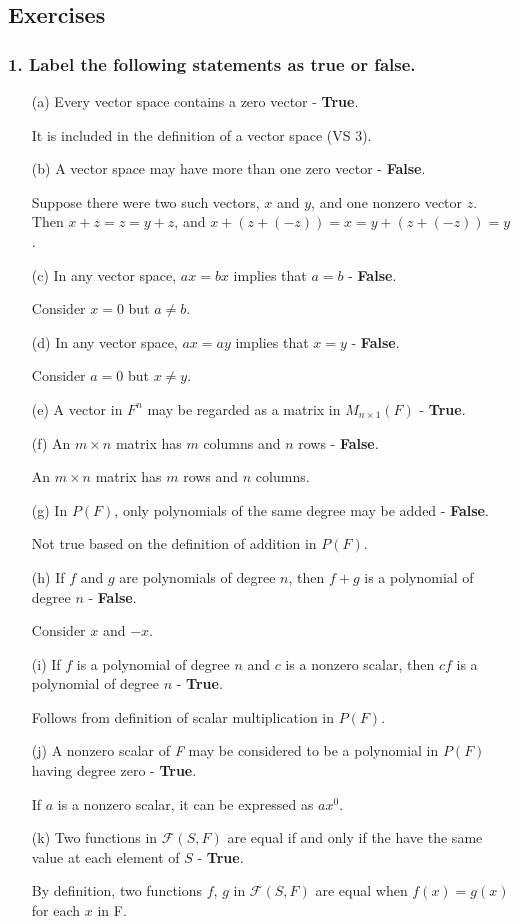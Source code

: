 \documentclass{article}
\begin{document}
\pagebreak
\subsection*{Exercises}
\subsubsection*{1. Label the following statements as true or false.}
\begin{enumerate}
	\item[(a)] Every vector space contains a zero vector - \textbf{True}.
	
	It is included in the definition of a vector space (VS 3).
	\item[(b)] A vector space may have more than one zero vector - \textbf{False}.
	
	Suppose there were two such vectors, $x$ and $y$, and one nonzero vector $z$. Then $x + z = z = y + z$, and $x + (z + (-z)) = x = y + (z + (-z)) = y$. 
	\item[(c)] In any vector space, $ax = bx$ implies that $a = b$ - \textbf{False}.
	
	Consider $x = \textit{0}$ but $a \ne b$.
	\item[(d)] In any vector space, $ax = ay$ implies that $x = y$ - \textbf{False}.
	
	Consider $a = 0$ but $x \ne y$.
	\item[(e)] A vector in $F^n$ may be regarded as a matrix in $M_{n\times 1}(F)$ - \textbf{True}.
	\item[(f)] An $m \times n$ matrix has $m$ columns and $n$ rows - \textbf{False}.
	
	An $m \times n$ matrix has $m$ rows and $n$ columns.
	\item[(g)] In $P(F)$, only polynomials of the same degree may be added - \textbf{False}.
	
	Not true based on the definition of addition in $P(F)$.
	\item[(h)] If $f$ and $g$ are polynomials of degree $n$, then $f + g$ is a polynomial of degree $n$ - \textbf{False}.
	
	Consider $x$ and $-x$.
	\item[(i)] If $f$ is a polynomial of degree $n$ and $c$ is a nonzero scalar, then $cf$ is a polynomial of degree $n$ - \textbf{True}.
	
	Follows from definition of scalar multiplication in $P(F)$.
	\item[(j)] A nonzero scalar of \textit{F} may be considered to be a polynomial in $P(F)$ having degree zero - \textbf{True}.
	
	If $a$ is a nonzero scalar, it can be expressed as $ax^0$.
	\item[(k)] Two functions in $\mathcal{F}(S, F)$ are equal if and only if the have the same value at each element of $S$ - \textbf{True}.
	
	By definition, two functions $f$, $g$ in $\mathcal{F}(S, F)$ are equal when $f(x) = g(x)$ for each $x$ in F.
\end{enumerate}
\end{document}
